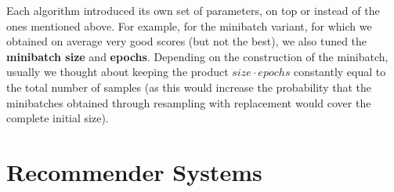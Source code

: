 \documentclass[11pt]{article}
\begin{document}
\begin{enumerate}
\begin{itemize}
Each algorithm introduced its own set of parameters, on top or instead
of the ones mentioned above. For example, for the minibatch variant, for which we
obtained on average very good scores (but not the best), we also tuned
the \textbf{minibatch size} and \textbf{epochs}. Depending on the
construction of the minibatch, usually we thought about keeping the
product $ size \cdot epochs $ constantly equal to the total number of
samples (as this would increase the probability that the minibatches
obtained through resampling with replacement would cover the complete
initial size).

\end{itemize}

\end{enumerate}

\section{Recommender Systems}
\end{document}

